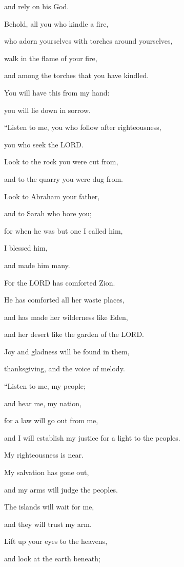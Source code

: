 and rely on his God.

\myverse{}Behold, all you who kindle a fire,

who adorn yourselves with torches around yourselves,

walk in the flame of your fire,

and among the torches that you have kindled.

You will have this from my hand:

you will lie down in sorrow.


\mychapter{} \myverse*{}“Listen to me, you who follow after righteousness,

\quad\quad you who seek the LORD.

Look to the rock you were cut from,

and to the quarry you were dug from.

\myverse{}Look to Abraham your father,

and to Sarah who bore you;

for when he was but one I called him,

I blessed him,

and made him many.

\myverse{}For the LORD has comforted Zion.

He has comforted all her waste places,

and has made her wilderness like Eden,

and her desert like the garden of the LORD.

Joy and gladness will be found in them,

thanksgiving, and the voice of melody.


\vspace{\baselineskip} \myverse{}“Listen to me, my people;

and hear me, my nation,

for a law will go out from me,

and I will establish my justice for a light to the peoples.

\myverse{}My righteousness is near.

My salvation has gone out,

and my arms will judge the peoples.

The islands will wait for me,

and they will trust my arm.

\myverse{}Lift up your eyes to the heavens,

and look at the earth beneath;

